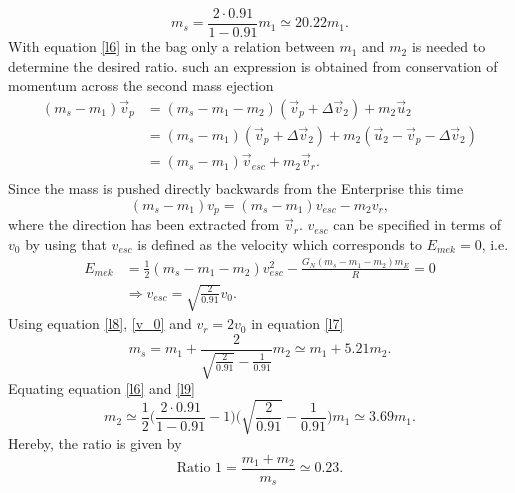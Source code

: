 \begin{example}
\begin{enumerate}
\begin{equation}
			m_s=\frac{2\cdot 0.91}{1-0.91}m_1\simeq 20.22 m_1.
			\label{l6}
		\end{equation} 
		With equation \eqref{l6} in the bag only a relation between $m_1$ and $m_2$ is needed to determine the desired ratio. such an expression is obtained from conservation of momentum across the second mass ejection
		\begin{equation}
			\begin{split}
				(m_s-m_1)\vec{v}_p&=(m_s-m_1-m_2)(\vec{v}_p+\Delta \vec{v}_2)+m_2\vec{u}_2\\
				&=(m_s-m_1)(\vec{v}_p+\Delta \vec{v}_2)+m_2(\vec{u}_2-\vec{v}_p-\Delta \vec{v}_2)\\
				&=(m_s-m_1)\vec{v}_{esc}+m_2\vec{v}_r.\\
			\end{split}
		\end{equation} 
		Since the mass is pushed directly backwards from the Enterprise this time
		\begin{equation}	
			(m_s-m_1)v_p=(m_s-m_1)v_{esc}-m_2v_r,
			\label{l7}	
		\end{equation} 
		where the direction has been extracted from $\vec{v}_r$. $v_{esc}$ can be specified in terms of $v_0$ by using that $v_{esc}$ is defined as the velocity which corresponds to $E_{mek}=0$,  i.e.
		\begin{equation}
			\begin{split}
				E_{mek}&=\frac{1}{2}(m_s-m_1-m_2)v_{esc}^2-\frac{G_N(m_s-m_1-m_2)m_E}{R}=0\\
				&\Rightarrow v_{esc}=\sqrt{\frac{2}{0.91}}v_0.
			\end{split}
			\label{l8}
		\end{equation} 
		Using equation \eqref{l8}, \eqref{v_0} and $v_r=2v_0$ in equation \eqref{l7}
		\begin{equation}
			m_s= m_1+\frac{2}{\sqrt{\frac{2}{0.91}}-\frac{1}{0.91}}m_2\simeq m_1+5.21m_2.
			\label{l9}
		\end{equation} 
		Equating equation \eqref{l6} and \eqref{l9}
		\begin{equation}
			m_2\simeq\frac{1}{2}\bigg(\frac{2\cdot 0.91}{1-0.91}-1\bigg)\bigg(\sqrt{\frac{2}{0.91}}-\frac{1}{0.91}\bigg) m_1\simeq 3.69 m_1.
		\end{equation} 
		Hereby, the ratio is given by
		\begin{equation}
			\text{Ratio 1}=\frac{m_1+m_2}{m_s}\simeq 0.23.
			\label{ratio1}
		\end{equation} 
		

\end{enumerate}
\end{example}
